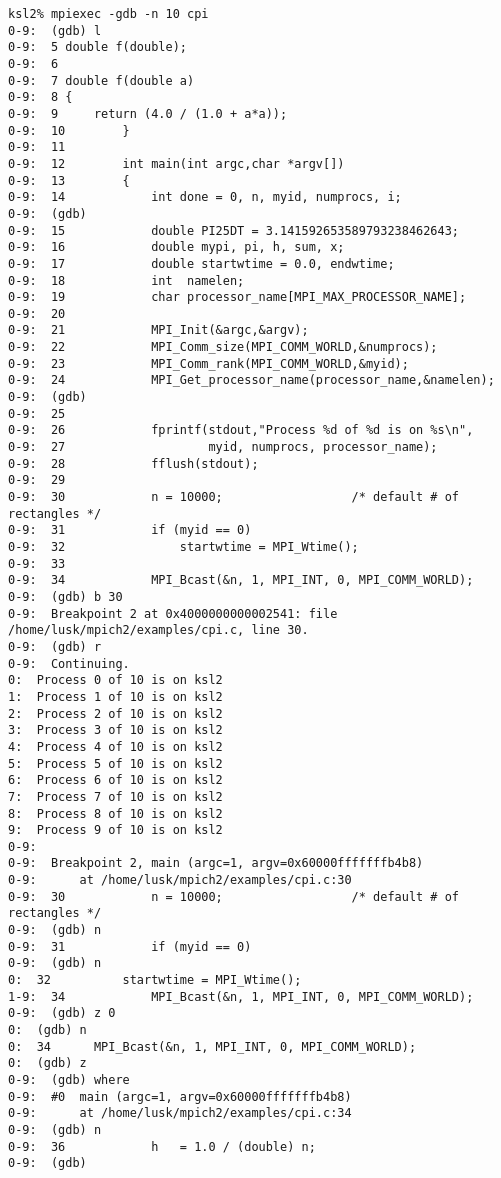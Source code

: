 \documentclass[dvipdfm,11pt]{article}
\begin{document}
%
\begin{tiny}
\begin{verbatim}
ksl2% mpiexec -gdb -n 10 cpi
0-9:  (gdb) l
0-9:  5 double f(double);
0-9:  6 
0-9:  7 double f(double a)
0-9:  8 {
0-9:  9     return (4.0 / (1.0 + a*a));
0-9:  10        }
0-9:  11        
0-9:  12        int main(int argc,char *argv[])
0-9:  13        {
0-9:  14            int done = 0, n, myid, numprocs, i;
0-9:  (gdb) 
0-9:  15            double PI25DT = 3.141592653589793238462643;
0-9:  16            double mypi, pi, h, sum, x;
0-9:  17            double startwtime = 0.0, endwtime;
0-9:  18            int  namelen;
0-9:  19            char processor_name[MPI_MAX_PROCESSOR_NAME];
0-9:  20        
0-9:  21            MPI_Init(&argc,&argv);
0-9:  22            MPI_Comm_size(MPI_COMM_WORLD,&numprocs);
0-9:  23            MPI_Comm_rank(MPI_COMM_WORLD,&myid);
0-9:  24            MPI_Get_processor_name(processor_name,&namelen);
0-9:  (gdb) 
0-9:  25        
0-9:  26            fprintf(stdout,"Process %d of %d is on %s\n",
0-9:  27                    myid, numprocs, processor_name);
0-9:  28            fflush(stdout);
0-9:  29        
0-9:  30            n = 10000;                  /* default # of rectangles */
0-9:  31            if (myid == 0)
0-9:  32                startwtime = MPI_Wtime();
0-9:  33        
0-9:  34            MPI_Bcast(&n, 1, MPI_INT, 0, MPI_COMM_WORLD);
0-9:  (gdb) b 30
0-9:  Breakpoint 2 at 0x4000000000002541: file /home/lusk/mpich2/examples/cpi.c, line 30.
0-9:  (gdb) r
0-9:  Continuing.
0:  Process 0 of 10 is on ksl2
1:  Process 1 of 10 is on ksl2
2:  Process 2 of 10 is on ksl2
3:  Process 3 of 10 is on ksl2
4:  Process 4 of 10 is on ksl2
5:  Process 5 of 10 is on ksl2
6:  Process 6 of 10 is on ksl2
7:  Process 7 of 10 is on ksl2
8:  Process 8 of 10 is on ksl2
9:  Process 9 of 10 is on ksl2
0-9:  
0-9:  Breakpoint 2, main (argc=1, argv=0x60000fffffffb4b8)
0-9:      at /home/lusk/mpich2/examples/cpi.c:30
0-9:  30            n = 10000;                  /* default # of rectangles */
0-9:  (gdb) n
0-9:  31            if (myid == 0)
0-9:  (gdb) n
0:  32          startwtime = MPI_Wtime();
1-9:  34            MPI_Bcast(&n, 1, MPI_INT, 0, MPI_COMM_WORLD);
0-9:  (gdb) z 0
0:  (gdb) n
0:  34      MPI_Bcast(&n, 1, MPI_INT, 0, MPI_COMM_WORLD);
0:  (gdb) z
0-9:  (gdb) where
0-9:  #0  main (argc=1, argv=0x60000fffffffb4b8)
0-9:      at /home/lusk/mpich2/examples/cpi.c:34
0-9:  (gdb) n
0-9:  36            h   = 1.0 / (double) n;
0-9:  (gdb) 

\end{verbatim}
\end{tiny}
\end{document}
